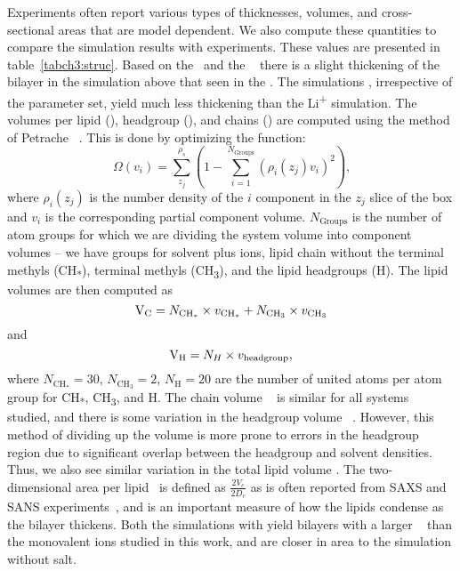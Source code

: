 Experiments often report various types of thicknesses, volumes, and cross-sectional areas that are model dependent.
We also compute these quantities to compare the simulation results with experiments. These values are presented in 
table~\ref{tabch3:struc}.
Based on the \dhh~and the \dc~ there is a slight thickening 
of the bilayer in the \li{} {simulation} above that seen in the .
The \mg simulations {, irrespective of the parameter set, yield} much less thickening than {the}  
Li\textsuperscript{+} {simulation.} 
{The volumes per lipid (\vl), headgroup (\vh), and chains (\vc) are computed using the method of
Petrache \etal{}~\cite{petrache:1997}. This is done by optimizing the function:
\begin{equation}
    \label{eq:volumeobj}
    \Omega(v_i)=\sum^{\rho_s}_{z_j}(1-\sum^{N_{\text{Groups}}}_{i=1}{(\rho_i(z_j)v_i)^2})\text{,}
\end{equation}
where $\rho_i(z_j)$ is the number density of the $i$ component in the
$z_j$ slice of the box and $v_i$ is the corresponding partial component volume. $N_\text{Groups}$ is the number
of atom groups for which we are dividing the system volume into component volumes -- we have groups for solvent plus ions,
lipid chain without the terminal methyls (CH\textsubscript{*}), terminal methyls (CH\textsubscript{3}), and the lipid headgroups (H).
The lipid volumes are then computed as 
\begin{equation}
    \text{$\text{V}_{\text{C}}$}=N_{\text{CH}_*} \times v_{\text{CH}_*}+N_{\text{CH}_3} \times v_{\text{CH\textsubscript{3}}}
\end{equation}
and
\begin{equation}
    \text{$\text{V}_{\text{H}}$}=N_{H} \times v_{\text{headgroup}}\text{,}
\end{equation}
where $N_{\text{CH}_*}=30$, $N_{\text{CH}_3}=2$, $N_{\text{H}}=20$ are the number of united atoms per atom group for CH\textsubscript{*},
CH\textsubscript{3}, and H.
}{
The chain volume \vc~ is similar for all systems studied, and there is some variation in the headgroup volume \vh~.
However, this method of dividing up the volume is more prone to errors in the headgroup region due to 
significant overlap between the headgroup and solvent densities. 
Thus, we also see similar variation in the total lipid volume \vl. 
}
The two-dimensional area per lipid \al~is defined as
{$\frac{2V_c}{2D_c}$ as is often reported from SAXS and SANS experiments~\cite{nagle:2000}, and is an important
measure of how the lipids condense as the bilayer thickens.}
{Both the simulations with \mg yield bilayers with a larger \al~ 
    than the monovalent ions studied in this work, and are closer
in area to the simulation without salt.
}

